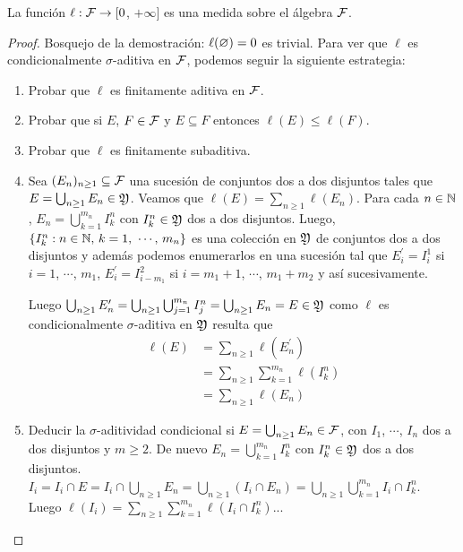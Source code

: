 \begin{lemma}
    La función \(\ell : \mathcal{F} \to [0\), \(+\infty]\) es una medida sobre el álgebra \(\mathcal{F}\).
    \begin{proof}
        Bosquejo de la demostración: \(\ell(\varnothing) = 0\) es trivial.
        Para ver que \(\ell\) es condicionalmente \(\sigma\)-aditiva en \(\mathcal{F}\), podemos seguir la siguiente estrategia: \begin{enumerate}
            \item Probar que \(\ell\) es finitamente aditiva en \(\mathcal{F}\).
            \item Probar que si \(E\), \(F \in \mathcal{F}\) y \(E \subseteq F\) entonces \(\ell(E) \leq \ell(F)\).
            \item Probar que \(\ell\) es finitamente subaditiva.
            \item Sea \((E_n)_{n \geq 1} \subseteq \mathcal{F}\) una sucesión de conjuntos dos a dos disjuntos tales que \(E = \bigcup_{n \geq 1} E_n \in \mathfrak{Y}\). Veamos que
                  \(\ell(E) = \sum_{n \geq 1} \ell(E_n)\). Para cada \(n \in \mathbb{N}\), \(E_n = \bigcup_{k = 1}^{m_n} I_k^n\) con \(I_k^n \in \mathfrak{Y}\) dos a dos disjuntos.
                  Luego, \(\{ I_k^n : n \in \mathbb{N} \text{, } k = 1 \text{, } \cdots \text{, } m_n \}\) es una colección en \(\mathfrak{Y}\) de conjuntos dos a dos disjuntos y además podemos enumerarlos en una sucesión tal que
                  \(E_i^\prime = I_i^1\) si \(i = 1\), \(\cdots\), \(m_1\), \(E_i^\prime = I_{i - m_1}^2\) si \(i = m_1 + 1\), \(\cdots\), \(m_1 + m_2\) y así sucesivamente.

                  Luego \(\bigcup_{n \geq 1} E_n^\prime = \bigcup_{n \geq 1} \bigcup_{j = 1}^{m_n} I_j^n = \bigcup_{n \geq 1} E_n = E \in \mathfrak{Y}\) como \(\ell\) es condicionalmente \(\sigma\)-aditiva en \(\mathfrak{Y}\) resulta que \begin{align*}
                      \ell(E) & = \sum_{n \geq 1} \ell(E_n^\prime)               \\
                              & = \sum_{n \geq 1} \sum_{k = 1}^{m_n} \ell(I_k^n) \\
                              & = \sum_{n \geq 1} \ell(E_n)
                  \end{align*}
            \item Deducir la \(\sigma\)-aditividad condicional si \(E = \bigcup_{n \geq 1} E_n \in \mathcal{F}\), con \(I_1\), \(\cdots\), \(I_n\) dos a dos disjuntos y \(m \geq 2\).
                  De nuevo \(E_n = \bigcup_{k = 1}^{m_n} I_k^n\) con \(I_k^n \in \mathfrak{Y}\) dos a dos disjuntos. \\
                  \(I_i = I_i \cap E = I_i \cap \bigcup_{n \geq 1} E_n = \bigcup_{n \geq 1} (I_i \cap E_n) = \bigcup_{n \geq 1} \bigcup_{k = 1}^{m_n} I_i \cap I_k^n\). \\
                  Luego \(\ell(I_i) = \sum_{n \geq 1} \sum_{k = 1}^{m_n} \ell(I_i \cap I_k^n)\)...
        \end{enumerate}
    \end{proof}
\end{lemma}